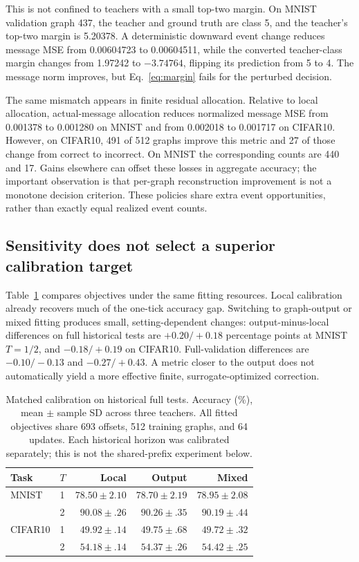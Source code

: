 \documentclass[10pt,twocolumn,letterpaper]{article}
\begin{document}
This is not confined to teachers with a small top-two margin. On MNIST validation graph 437, the teacher and ground truth are class 5, and the teacher's top-two margin is 5.20378. A deterministic downward event change reduces message MSE from 0.00604723 to 0.00604511, while the converted teacher-class margin changes from 1.97242 to $-3.74764$, flipping its prediction from 5 to 4. The message norm improves, but Eq.~\eqref{eq:margin} fails for the perturbed decision.

The same mismatch appears in finite residual allocation. Relative to local allocation, actual-message allocation reduces normalized message MSE from 0.001378 to 0.001280 on MNIST and from 0.002018 to 0.001717 on CIFAR10. However, on CIFAR10, 491 of 512 graphs improve this metric and 27 of those change from correct to incorrect. On MNIST the corresponding counts are 440 and 17. Gains elsewhere can offset these losses in aggregate accuracy; the important observation is that per-graph reconstruction improvement is not a monotone decision criterion. These policies share extra event opportunities, rather than exactly equal realized event counts.

\subsection{Sensitivity does not select a superior calibration target}
Table~\ref{tab:calibration} compares objectives under the same fitting resources. Local calibration already recovers much of the one-tick accuracy gap. Switching to graph-output or mixed fitting produces small, setting-dependent changes: output-minus-local differences on full historical tests are $+0.20/+0.18$ percentage points at MNIST $T=1/2$, and $-0.18/+0.19$ on CIFAR10. Full-validation differences are $-0.10/-0.13$ and $-0.27/+0.43$. A metric closer to the output does not automatically yield a more effective finite, surrogate-optimized correction.

\begin{table}[t]
\caption{Matched calibration on historical full tests. Accuracy (\%), mean $\pm$ sample SD across three teachers. All fitted objectives share 693 offsets, 512 training graphs, and 64 updates. Each historical horizon was calibrated separately; this is not the shared-prefix experiment below.}
\label{tab:calibration}
\centering\small\setlength{\tabcolsep}{3pt}
\begin{tabular}{llrrr}\toprule
Task & $T$ & Local & Output & Mixed\\\midrule
MNIST & 1 & $78.50\pm2.10$ & $78.70\pm2.19$ & $78.95\pm2.08$\\
 & 2 & $90.08\pm.26$ & $90.26\pm.35$ & $90.19\pm.44$\\
CIFAR10 & 1 & $49.92\pm.14$ & $49.75\pm.68$ & $49.72\pm.32$\\
 & 2 & $54.18\pm.14$ & $54.37\pm.26$ & $54.42\pm.25$\\\bottomrule
\end{tabular}
\end{table}
\end{document}
